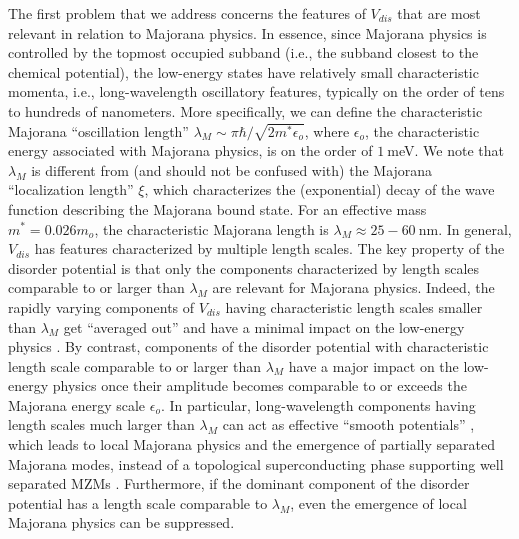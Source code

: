 \documentclass[aps,prmaterials,twocolumn,superscriptaddress,longbibliography]{revtex4-2}
\begin{document}
The first problem that we address concerns the features of $V_{dis}$ that are most relevant in relation to Majorana physics. In essence, since Majorana physics is controlled by the topmost occupied subband (i.e., the subband closest to the chemical potential), the low-energy states have relatively small characteristic momenta, i.e.,  long-wavelength oscillatory features, typically on the order of tens to hundreds of nanometers.  More specifically, 
we can define the characteristic Majorana ``oscillation length'' $\lambda_M \sim \pi \hbar/\sqrt{2 m^* \epsilon_o}$, where $\epsilon_o$, the characteristic energy associated with Majorana physics, is on the order of $1~$meV. We note that $\lambda_M$ is different from (and should not be confused with) the Majorana ``localization length'' $\xi$, which characterizes the (exponential) decay of the wave function describing the Majorana bound state. 
For an effective mass $m^*=0.026m_o$, the characteristic Majorana length is $\lambda_M \approx 25-60~$nm. In general, $V_{dis}$ has features characterized by multiple length scales.
The key property of the disorder potential is that only the components characterized by length scales comparable to or larger than $\lambda_M$ are relevant for Majorana physics. Indeed, the rapidly varying components of $V_{dis}$  having characteristic length scales smaller than $\lambda_M$ get ``averaged out'' and have a minimal impact on the low-energy physics \cite{zeng2021partiallyseparated}. By contrast, components of the disorder potential with characteristic length scale comparable to or larger than $\lambda_M$ have a major impact on the low-energy physics once their amplitude becomes comparable to or exceeds the Majorana energy scale $\epsilon_o$. In particular, long-wavelength components having length scales much larger than $\lambda_M$ can act as effective ``smooth potentials'' \cite{kells2012nearzeroenergy,stanescu2019robust}, which leads to local Majorana physics and the emergence of partially separated Majorana modes, instead of a topological superconducting phase supporting well separated MZMs \cite{zeng2021partiallyseparated}. Furthermore, if the dominant component of the disorder potential has a length scale comparable to $\lambda_M$, even the emergence of local Majorana physics can be suppressed. 
\end{document}

